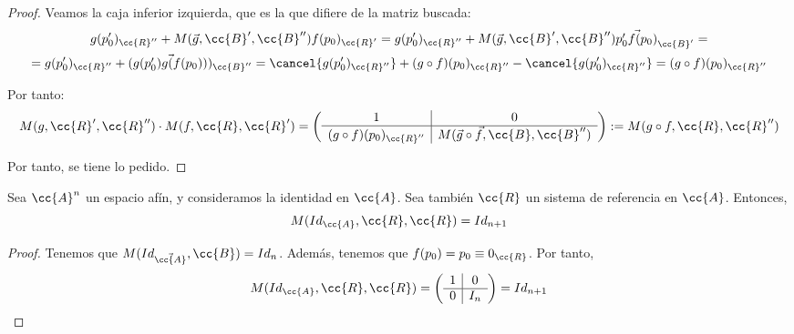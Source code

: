 \begin{proof}
    Veamos la caja inferior izquierda, que es la que difiere de la matriz buscada:
    \begin{multline*}
        g(p_0')_{\cc{R}''} + M(\vec{g},\cc{B}',\cc{B}'')f(p_0)_{\cc{R}'}
        = g(p_0')_{\cc{R}''} + M(\vec{g},\cc{B}',\cc{B}'')\vec{p_0'f(p_0)}_{\cc{B}'}
        =\\= g(p_0')_{\cc{R}''} + (\vec{g(p_0')g(f(p_0))})_{\cc{B}''}
        = \cancel{g(p_0')_{\cc{R}''}}+ (g\circ f)(p_0)_{\cc{R}''} - \cancel{g(p'_0)_{\cc{R}''}} = (g\circ f)(p_0)_{\cc{R}''}
    \end{multline*}

    Por tanto:
    \begin{equation*}
        M(g,\cc{R}', \cc{R}'')\cdot
        M(f,\cc{R}, \cc{R}') = \left(\begin{array}{c|c}
            1 & 0 \\ \hline
            (g\circ f)(p_0)_{\cc{R}''} &  M(\vec{g}\circ \vec{f},\cc{B},\cc{B}'')
        \end{array}\right)
        := M(g\circ f, \cc{R}, \cc{R}'')
    \end{equation*}

    Por tanto, se tiene lo pedido.
\end{proof}

\begin{lema}
    Sea $\cc{A}^n$ un espacio afín, y consideramos la identidad en $\cc{A}$. Sea también $\cc{R}$ un sistema de referencia en $\cc{A}$. Entonces,
    \begin{equation*}
        M(Id_{\cc{A}}, \cc{R}, \cc{R})
        = Id_{n+1}
    \end{equation*}
\end{lema}
\begin{proof}
    Tenemos que $M(Id_{\vec{\cc{A}}}, \cc{B})=Id_n$. Además, tenemos que $f(p_0)=p_0 \equiv 0_{\cc{R}}$. Por tanto,
    \begin{equation*}
        M(Id_{\cc{A}}, \cc{R}, \cc{R})
        = \left(\begin{array}{c|c}
            1 & 0 \\ \hline
            0 & I_n
        \end{array}\right) = Id_{n+1}
    \end{equation*}
\end{proof}

